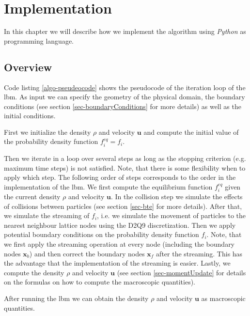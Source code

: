 \documentclass[a4paper,11pt, footsepline]{book}
\begin{document}
\chapter{Implementation}\label{ch-implementation}
In this chapter we will describe how we implement the algorithm using \textit{Python} as programming language.
\section{Overview}
Code listing \ref{algo-pseudeocode} shows the pseudocode of the iteration loop of the \ac{lbm}. As input we can specify the geometry of the physical domain, the boundary conditions (see section \ref{sec-boundaryConditions} for more details) as well as the initial conditions. 

First we initialize the density $\rho$ and velocity $\mathbf{u}$ and compute the initial value of the probability density function $f_{i}^{eq}=f_{i}$. 

Then we iterate in a loop over several steps as long as the stopping criterion (e.g. maximum time steps) is not satisfied. Note, that there is some flexibility when to apply which step. \cite{Kruger.2016, Succi.2018} The following order of steps corresponds to the order in the implementation of the \ac{lbm}. We first compute the equilibrium function $f_{i}^{eq}$ given the current density $\rho$ and velocity $\mathbf{u}$. In the collision step we simulate the effects of collisions between particles (see section \ref{sec-bte} for more details). After that, we simulate the streaming of $f_i$, i.e. we simulate the movement of particles to the nearest neighbour lattice nodes using the D2Q9 discretization. Then we apply potential boundary conditions on the probability density function $f_i$. Note, that we first apply the streaming operation at every node (including the boundary nodes $\mathbf{x}_{b}$) and then correct the boundary nodes $\mathbf{x}_{f}$ after the streaming. This has the advantage that the implementation of the streaming is easier. Lastly, we compute the density $\rho$ and velocity $\mathbf{u}$ (see section \ref{sec-momentUpdate} for details on the formulas on how to compute the macroscopic quantities).

After running the \ac{lbm} we can obtain the density $\rho$ and velocity $\mathbf{u}$ as macroscopic quantities.
\end{document}
